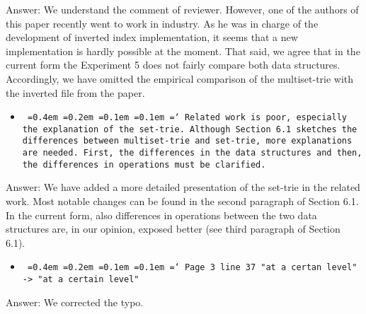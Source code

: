 \documentclass[11pt,a4paper]{article}
\newcommand*\justify{%
  \fontdimen2\font=0.4em%
  \fontdimen3\font=0.2em%
  \fontdimen4\font=0.1em%
  \fontdimen7\font=0.1em%
  \hyphenchar\font=`\-%
}
\newcommand{\comment}[1]{\begin{itemize}
    \item {\tt\justify #1}
\end{itemize}}
\newcommand{\answer}[1]{{\sc Answer:} #1}
\begin{document}
\answer{We understand the comment of reviewer. However, one of the authors of this paper recently went to work in industry.
As he was in charge of the development of inverted index implementation, it seems that a new implementation is hardly possible at the moment.
That said, we agree that in the current form the Experiment 5 does not fairly compare both data structures.
Accordingly, we have omitted the empirical comparison of the multiset-trie with the inverted file from the paper.
}


\comment{Related work is poor, especially the explanation of the set-trie. Although Section 6.1 sketches the differences between multiset-trie and set-trie, more explanations are needed. First, the differences in the data structures and then, the differences in operations must be clarified.
}


\answer{We have added a more detailed presentation of the set-trie in the related work.
Most notable changes can be found in the second paragraph of Section 6.1.
In the current form, also differences in operations between the two data structures are, in our opinion, exposed better (see third paragraph of Section 6.1).
}
\comment{Page 3 line 37 "at a certan level" -> "at a certain level"
}

\answer{We corrected the typo.}
\end{document}
